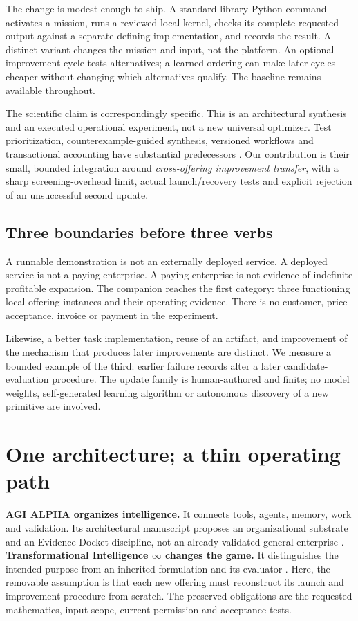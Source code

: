 \documentclass[11pt,letterpaper]{article}
\begin{document}
The change is modest enough to ship. A standard-library Python command activates a mission, runs a reviewed local kernel, checks its complete requested output against a separate defining implementation, and records the result. A distinct variant changes the mission and input, not the platform. An optional improvement cycle tests alternatives; a learned ordering can make later cycles cheaper without changing which alternatives qualify. The baseline remains available throughout.

The scientific claim is correspondingly specific. This is an architectural synthesis and an executed operational experiment, not a new universal optimizer. Test prioritization, counterexample-guided synthesis, versioned workflows and transactional accounting have substantial predecessors \cite{rothermel,elbaum,cegis,sqlite}. Our contribution is their small, bounded integration around \emph{cross-offering improvement transfer}, with a sharp screening-overhead limit, actual launch/recovery tests and explicit rejection of an unsuccessful second update.

\subsection{Three boundaries before three verbs}
A runnable demonstration is not an externally deployed service. A deployed service is not a paying enterprise. A paying enterprise is not evidence of indefinite profitable expansion. The companion reaches the first category: three functioning local offering instances and their operating evidence. There is no customer, price acceptance, invoice or payment in the experiment.

Likewise, a better task implementation, reuse of an artifact, and improvement of the mechanism that produces later improvements are distinct. We measure a bounded example of the third: earlier failure records alter a later candidate-evaluation procedure. The update family is human-authored and finite; no model weights, self-generated learning algorithm or autonomous discovery of a new primitive are involved.

\section{One architecture; a thin operating path}
\textbf{AGI ALPHA organizes intelligence.} It connects tools, agents, memory, work and validation. Its architectural manuscript proposes an organizational substrate and an Evidence Docket discipline, not an already validated general enterprise \cite{alpha}. \textbf{Transformational Intelligence $\infty$ changes the game.} It distinguishes the intended purpose from an inherited formulation and its evaluator \cite{ti}. Here, the removable assumption is that each new offering must reconstruct its launch and improvement procedure from scratch. The preserved obligations are the requested mathematics, input scope, current permission and acceptance tests.
\end{document}
